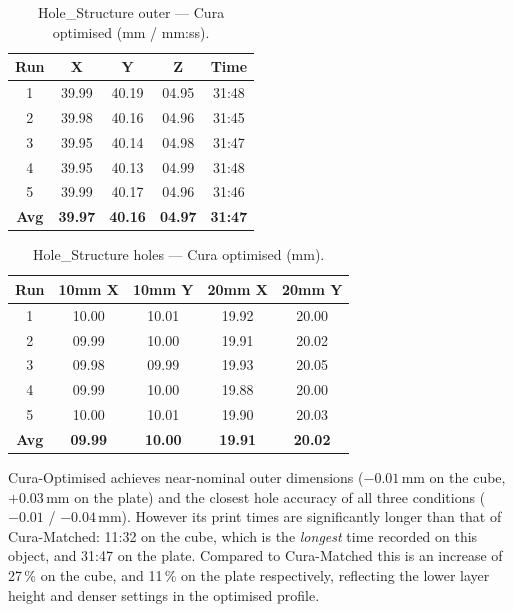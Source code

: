 \documentclass[10pt,twocolumn,a4paper]{article}
\begin{document}
\begin{table}[H]
\centering
\caption{Hole\_Structure outer — Cura optimised (mm / mm:ss).}
\label{tab:hole_cura_opt_out}
\small
\begin{tabular}{@{}ccccc@{}}
\toprule
\textbf{Run} & \textbf{X} & \textbf{Y} & \textbf{Z} & \textbf{Time} \\
\midrule
1 & 39.99 & 40.19 & 04.95 & 31:48 \\
2 & 39.98 & 40.16 & 04.96 & 31:45 \\
3 & 39.95 & 40.14 & 04.98 & 31:47 \\
4 & 39.95 & 40.13 & 04.99 & 31:48 \\
5 & 39.99 & 40.17 & 04.96 & 31:46 \\
\midrule
\textbf{Avg} & \textbf{39.97} & \textbf{40.16} & \textbf{04.97} & \textbf{31:47} \\
\bottomrule
\end{tabular}
\end{table}

\begin{table}[H]
\centering
\caption{Hole\_Structure holes — Cura optimised (mm).}
\label{tab:hole_cura_opt_holes}
\small
\begin{tabular}{@{}ccccc@{}}
\toprule
\textbf{Run} & \textbf{10mm X} & \textbf{10mm Y} & \textbf{20mm X} & \textbf{20mm Y} \\
\midrule
1 & 10.00 & 10.01 & 19.92 & 20.00 \\
2 & 09.99 & 10.00 & 19.91 & 20.02 \\
3 & 09.98 & 09.99 & 19.93 & 20.05 \\
4 & 09.99 & 10.00 & 19.88 & 20.00 \\
5 & 10.00 & 10.01 & 19.90 & 20.03 \\
\midrule
\textbf{Avg} & \textbf{09.99} & \textbf{10.00} & \textbf{19.91} & \textbf{20.02} \\
\bottomrule
\end{tabular}
\end{table}

Cura-Optimised achieves near-nominal outer dimensions
($-0.01$\,mm on the cube, $+0.03$\,mm on the plate)
and the closest hole accuracy of all three conditions
($-0.01$ / $-0.04$\,mm). However its print times are significantly longer than that of Cura-Matched: 11:32 on the cube, which is the \emph{longest} time recorded on this object, and 31:47 on the plate. Compared to Cura-Matched this is an increase of 27\,\% on the cube, and 11\,\% on the plate respectively, reflecting the lower layer height and denser
settings in the optimised profile.
\end{document}
